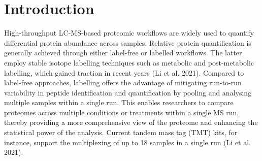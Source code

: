 \documentclass[
  letterpaper,
  DIV=11,
  numbers=noendperiod]{scrartcl}
\begin{document}
\section{Introduction}

High-throughput LC-MS-based proteomic workflows are widely used to
quantify differential protein abundance across samples. Relative protein
quantification is generally achieved through either label-free or
labelled workflows. The latter employ stable isotope labelling
techniques such as metabolic and post-metabolic labelling, which gained
traction in recent years (Li et al. 2021). Compared to label-free
approaches, labelling offers the advantage of mitigating run-to-run
variability in peptide identification and quantification by pooling and
analysing multiple samples within a single run. This enables researchers
to compare proteomes across multiple conditions or treatments within a
single MS run, thereby providing a more comprehensive view of the
proteome and enhancing the statistical power of the analysis. Current
tandem mass tag (TMT) kits, for instance, support the multiplexing of up
to 18 samples in a single run (Li et al. 2021).
\end{document}
